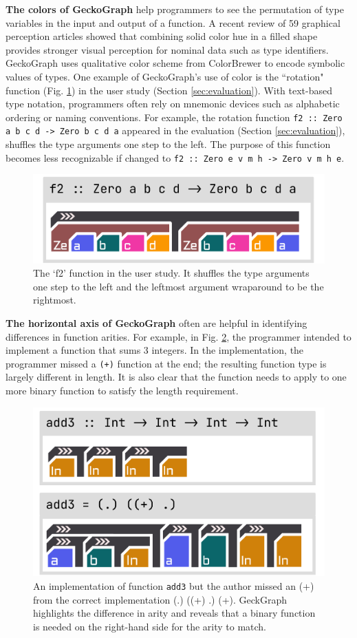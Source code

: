 \documentclass[preprint,12pt]{elsarticle}
\begin{document}
\textbf{The colors of GeckoGraph} help programmers to see the permutation of type variables in the input and output of a function. A recent review \cite{Zeng2023-jz} of 59 graphical perception articles showed that combining solid color hue in a filled shape provides stronger visual perception for nominal data such as type identifiers. GeckoGraph uses qualitative color scheme from ColorBrewer \cite{Harrower2003-vu} to encode symbolic values of types. One example of GeckoGraph's use of color is the ``rotation" function  (Fig. \ref{fig:rotate}) in the user study (Section \ref{sec:evaluation}). With text-based type notation, programmers often rely on mnemonic devices such as alphabetic ordering or naming conventions. For example, the rotation function \texttt{f2 :: Zero a b c d -> Zero b c d a} appeared in the evaluation (Section \ref{sec:evaluation}), shuffles the type arguments one step to the left. The purpose of this function becomes less recognizable if changed to \texttt{f2 :: Zero e v m h -> Zero v m h e}. 

\begin{figure}[]
  \includegraphics[width=0.6\linewidth]{figures/rotate}
  \caption{\label{fig:rotate} The `f2' function in the user study. It shuffles the type arguments one step to the left and the leftmost argument wraparound to be the rightmost.}
\end{figure}

\textbf{The horizontal axis of GeckoGraph} often are helpful in identifying differences in function arities. For example, in Fig. \ref{fig:add3}, the programmer intended to implement a function that sums 3 integers. In the implementation, the programmer missed a \texttt{(+)} function at the end; the resulting function type is largely different in length. It is also clear that the function needs to apply to one more binary function to satisfy the length requirement.  

\begin{figure}[]
  \includegraphics[width=0.6\linewidth]{figures/Add3}
  \caption{\label{fig:add3} An implementation of function \texttt{add3} but the author missed an (+) from the correct implementation (.) ((+) .) (+). GeckGraph highlights the difference in arity and reveals that a binary function is needed on the right-hand side for the arity to match. }
\end{figure}
\end{document}
